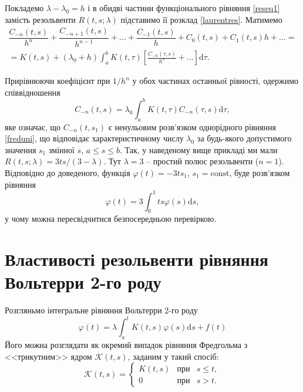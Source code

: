 \documentclass[14pt,twoside]{extreport}
\theoremstyle{mystyle}
\numberwithin{equation}{chapter}
\begin{document}
Покладемо $\lambda - \lambda_0 = h$ і в обидві частини функціонального рівняння \eqref{reseq1} замість резольвенти $R(t, s; \lambda)$ підставимо її розклад \eqref{laurentres}. Матимемо
\begin{multline*}
  \dfrac{C_{-n}(t, s) }{h^n} + \dfrac{C_{-n+1}(t, s) }{h^{n-1}} + \ldots + \dfrac{C_{-1}(t, s) }{h} + C_0(t, s) + C_1(t, s) h + \ldots =\\
  \displaystyle= K(t, s) + (\lambda_0 + h) \int_{a}^{b} K(t, \tau) \left[ \frac{C_{-n}(\tau, s)}{h^n} + \ldots\right] \mathrm{d}\tau.
\end{multline*}

Прирівнюючи коефіцієнт при $1/h^n$ у обох частинах останньої рівності, одержимо співвідношення
\begin{equation}\label{cminusn}
 C_{-n}(t, s) = \lambda_0 \int_{a}^{b} K(t, \tau) C_{-n}(\tau, s) \mathrm{d}\tau,
\end{equation}
яке означає, що $C_{-n}(t, s_1)$ є ненульовим розв'язком однорідного рівняння \eqref{freduni}, що відповідає характеристичному числу $\lambda_0$ за будь-якого допустимого значення $s_1$ змінної $s$, $a \leqslant s \leqslant b$. Так, у наведеному вище прикладі ми мали $R(t, s; \lambda) = 3ts/(3 - \lambda)$. Тут $\lambda = 3$ -- простий полюс резольвенти ($n = 1$).
Відповідно до доведеного, функція $\varphi (t) = -3ts_1$, $s_1 = \textrm{const}$, буде розв'язком рівняння
\[
 \varphi(t) = 3 \int_{0}^{1} ts \varphi(s) \mathrm{d}s,
\]
у чому можна пересвідчитися безпосередньою перевіркою.

\chapter{Властивості резольвенти рівняння Вольтерри 2-го роду}

Розгляньмо інтегральне рівняння Вольтерри 2-го роду
\begin{equation}\label{volt}
\varphi(t)=\lambda\int_{a}^{t} K(t,s) \varphi(s)\mathrm{d}s + f(t)
\end{equation}
Його можна розглядати як окремий випадок рівняння Фредгольма з <<трикутним>> ядром $\mathscr{K}(t, s)$, заданим у такий спосіб:
\[
\mathscr{K}(t, s) = \left\{
\begin{array}{ccc}
K(t, s) & \textrm{при} & s\leqslant t,\\
0 & \textrm{при} & s>t.
\end{array}
\right.
\]
\end{document}
